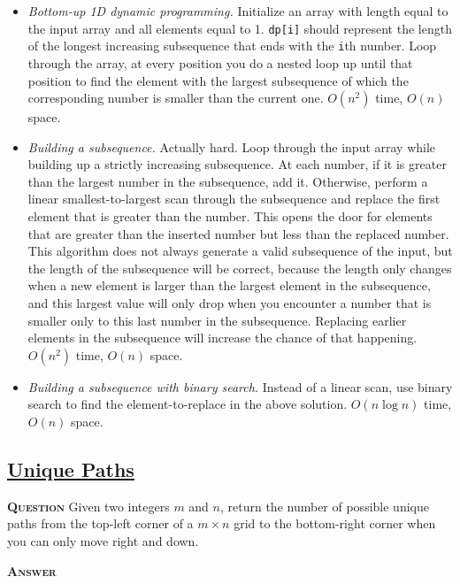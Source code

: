 \documentclass[table, xcdraw]{article}%
\begin{document}
\begin{itemize}
    \item \textit{Bottom-up 1D dynamic programming.} Initialize an array with length equal to the input array and all elements equal to 1. \texttt{dp[i]} should represent the length of the longest increasing subsequence that ends with the \texttt{i}th number. Loop through the array, at every position you do a nested loop up until that position to find the element with the largest subsequence of which the corresponding number is smaller than the current one. $O(n^2)$ time, $O(n)$ space.
    \item \textit{Building a subsequence.} Actually hard. Loop through the input array while building up a strictly increasing subsequence. At each number, if it is greater than the largest number in the subsequence, add it. Otherwise, perform a linear smallest-to-largest scan through the subsequence and replace the first element that is greater than the number. This opens the door for elements that are greater than the inserted number but less than the replaced number. This algorithm does not always generate a valid subsequence of the input, but the length of the subsequence will be correct, because the length only changes when a new element is larger than the largest element in the subsequence, and this largest value will only drop when you encounter a number that is smaller only to this last number in the subsequence. Replacing earlier elements in the subsequence will increase the chance of that happening. $O(n^2)$ time, $O(n)$ space.
    \item \textit{Building a subsequence with binary search.} Instead of a linear scan, use binary search to find the element-to-replace in the above solution. $O(n \log n)$ time, $O(n)$ space.
\end{itemize}

\subsection{\href{https://leetcode.com/problems/unique-paths}{Unique Paths}}

\textsc{\textbf{Question}} Given two integers $m$ and $n$, return the number of possible unique paths from the top-left corner of a $m \times n$ grid to the bottom-right corner when you can only move right and down.

\textsc{\textbf{Answer}}
\end{document}
